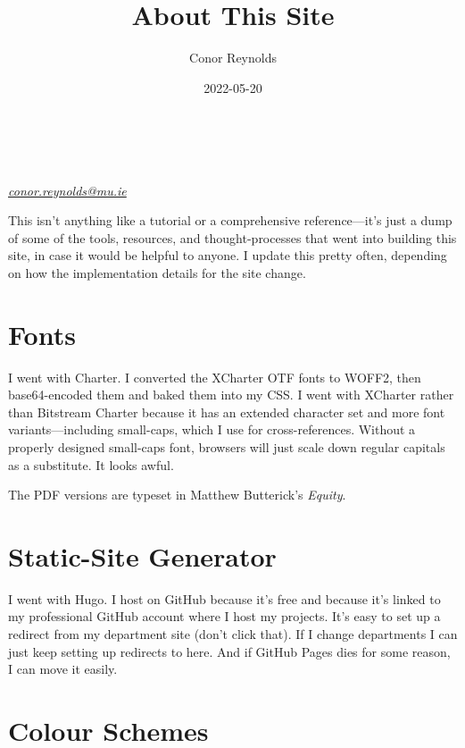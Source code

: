 \documentclass[a4paper,11pt,oneside,article]{memoir}
\title{About This Site}
\author{Conor Reynolds}
\date{2022-05-20}
\begin{document}
\begin{raggedright}
{\equityspaced \LARGE \thetitle}\\[1em]
\text{\small\theauthor}\\
\textit{\small\href{mailto:conor.reynolds@mu.ie}{conor.reynolds@mu.ie}}
\end{raggedright}
\vspace{2em}

\noindent
This isn't anything like a tutorial or a comprehensive reference—it's just a dump of some of the tools, resources, and thought-processes that went into building this site, in case it would be helpful to anyone. I update this pretty often, depending on how the implementation details for the site change.

\chapter[Fonts]{Fonts}

I went with Charter. I converted the XCharter OTF fonts to WOFF2, then base64-encoded them and baked them into my CSS. I went with XCharter rather than Bitstream Charter because it has an extended character set and more font variants—including small-caps, which I use for cross-references. Without a properly designed small-caps font, browsers will just scale down regular capitals as a substitute. It looks awful.

The PDF versions are typeset in Matthew Butterick's \emph{Equity}.

\chapter[Static-Site Generator]{Static-Site Generator}

I went with Hugo. I host on GitHub because it's free and because it's linked to my professional GitHub account where I host my projects. It's easy to set up a redirect from my department site (don't click that). If I change departments I can just keep setting up redirects to here. And if GitHub Pages dies for some reason, I can move it easily.

\chapter[Colour Schemes]{Colour Schemes}
\end{document}
